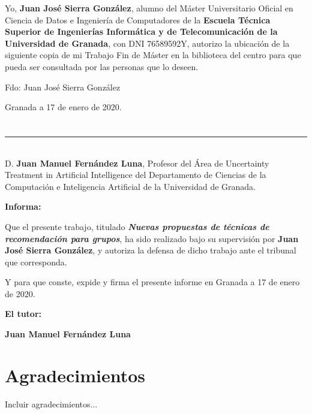 Yo, \textbf{Juan José Sierra González}, alumno del Máster Universitario Oficial en Ciencia de Datos e Ingeniería de Computadores de la \textbf{Escuela Técnica Superior de Ingenierías Informática y de Telecomunicación de la Universidad de Granada}, con DNI 76589592Y, autorizo la
ubicación de la siguiente copia de mi Trabajo Fin de Máster en la biblioteca del centro para que pueda ser
consultada por las personas que lo deseen.

\vspace{6cm}

\noindent Fdo: Juan José Sierra González

\vspace{2cm}

\begin{flushright}
Granada a 17 de enero de 2020.
\end{flushright}


\chapter*{}
\thispagestyle{empty}

\noindent\rule[-1ex]{\textwidth}{2pt}\\[4.5ex]

D. \textbf{Juan Manuel Fernández Luna}, Profesor del Área de Uncertainty Treatment in Artificial Intelligence del Departamento de Ciencias de la Computación e Inteligencia Artificial de la Universidad de Granada.

\vspace{0.5cm}

\textbf{Informa:}

\vspace{0.5cm}

Que el presente trabajo, titulado \textit{\textbf{Nuevas propuestas de técnicas de recomendación para grupos}},
ha sido realizado bajo su supervisión por \textbf{Juan José Sierra González}, y autoriza la defensa de dicho trabajo ante el tribunal
que corresponda.

\vspace{0.5cm}

Y para que conste, expide y firma el presente informe en Granada a 17 de enero de 2020.

\vspace{1cm}

\textbf{El tutor:}

\vspace{5cm}

\noindent \textbf{Juan Manuel Fernández Luna}

\chapter*{Agradecimientos}
\thispagestyle{empty}

\vspace{1cm}

Incluir agradecimientos...